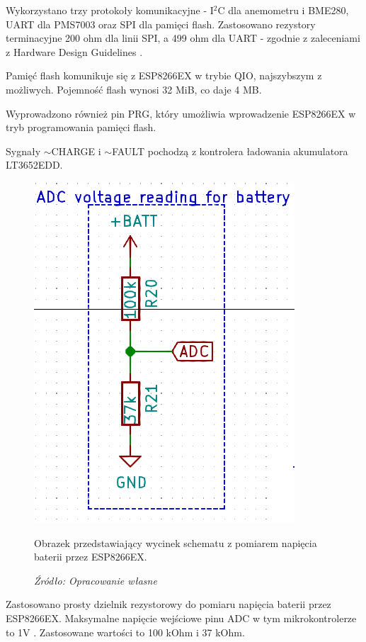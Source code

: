 \documentclass[12pt,a4paper,oneside]{memoir}
\begin{document}
\par Wykorzystano trzy protokoły komunikacyjne - I$^2$C dla anemometru i BME280, UART dla PMS7003 oraz SPI dla pamięci flash. Zastosowano rezystory terminacyjne 200 ohm dla linii SPI, a 499 ohm dla UART - zgodnie z zaleceniami z Hardware Design Guidelines \cite{esp8266exhdg}. 
\par Pamięć flash komunikuje się z ESP8266EX w trybie QIO, najszybszym z możliwych. Pojemność flash wynosi 32 MiB, co daje 4 MB. 
\par Wyprowadzono również pin PRG, który umożliwia wprowadzenie ESP8266EX w tryb programowania pamięci flash.
\par Sygnały {$\sim$CHARGE} i {$\sim$FAULT} pochodzą z kontrolera ładowania akumulatora LT3652EDD.
\begin{figure}[!h]
	\centering
	\includegraphics[scale=1]{images/sch/sch-09.png}
	{\tytulyrozdzialow \footnotesize \caption[Schemat - sekcja ADC] {Obrazek przedstawiający wycinek schematu z pomiarem napięcia baterii przez ESP8266EX.}}
	\caption*{\textit{Źródło: Opracowanie własne}}
\end{figure}
\par Zastosowano prosty dzielnik rezystorowy do pomiaru napięcia baterii przez ESP8266EX. Maksymalne napięcie wejściowe pinu ADC w tym mikrokontrolerze to 1V \cite{esp8266datasheet}. Zastosowane wartości to 100 kOhm i 37 kOhm.
\newpage
\end{document}
